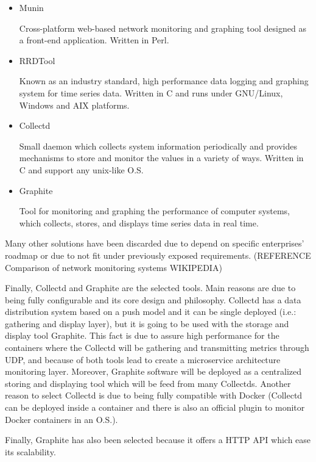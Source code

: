 \begin{itemize}
\item Munin \hfill

Cross-platform web-based network monitoring and graphing tool designed as a front-end application. Written in Perl.

\item RRDTool \hfill

Known as an industry standard, high performance data logging and graphing system for time series data. Written in C and runs under GNU/Linux, Windows and AIX platforms.

\item Collectd \hfill

Small daemon which collects system information periodically and provides mechanisms to store and monitor the values in a variety of ways. Written in C and support any unix-like O.S.

\item Graphite \hfill

Tool for monitoring and graphing the performance of computer systems, which collects, stores, and displays time series data in real time.

\end{itemize}

Many other solutions have been discarded due to depend on specific enterprises' roadmap or due to not fit under previously exposed requirements. (REFERENCE Comparison of network monitoring systems WIKIPEDIA) 

Finally, Collectd and Graphite are the selected tools. Main reasons are due to being fully configurable and its core design and philosophy. Collectd has a data distribution system based on a push model and it can be single deployed (i.e.: gathering and display layer), but it is going to be used with the storage and display tool Graphite. This fact is due to assure high performance for the containers where the Collectd will be gathering and transmitting metrics through UDP, and because of both tools lead to create a microservice architecture monitoring layer. Moreover, Graphite software will be deployed as a centralized storing and displaying tool which will be feed from many Collectds. Another reason to select Collectd is due to being fully compatible with Docker (Collectd can be deployed inside a container and there is also an official plugin to monitor Docker containers in an O.S.). 

Finally, Graphite has also been selected because it offers a HTTP API which ease its scalability. 

